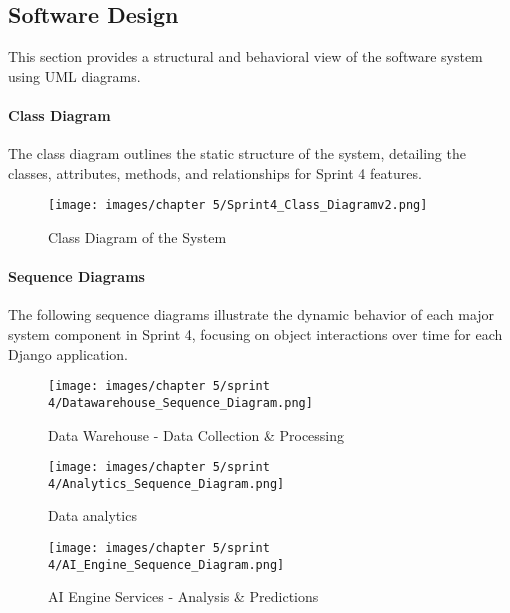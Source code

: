 \vfill
\newpage

\subsection{Software Design}

This section provides a structural and behavioral view of the software system using UML diagrams.

\paragraph{Class Diagram}

The class diagram outlines the static structure of the system, detailing the classes, attributes, methods, and relationships for Sprint 4 features.

\begin{figure}[H]
    \centering
    \texttt{[image: images/chapter 5/Sprint4\_Class\_Diagramv2.png]}
    \caption{Class Diagram of the System}
    \label{fig:class-diagram-sprint4}
\end{figure}

\paragraph{Sequence Diagrams}

The following sequence diagrams illustrate the dynamic behavior of each major system component in Sprint 4, focusing on object interactions over time for each Django application.

\begin{figure}[H]
    \centering
    \texttt{[image: images/chapter 5/sprint 4/Datawarehouse\_Sequence\_Diagram.png]}
    \caption{Data Warehouse - Data Collection \& Processing}
    \label{fig:Datawarehouse-sequence-diagram}
\end{figure}

\begin{figure}[H]
    \centering
    \texttt{[image: images/chapter 5/sprint 4/Analytics\_Sequence\_Diagram.png]}
    \caption{Data analytics}
    \label{fig:analytics-sequence-diagram}
\end{figure}

\begin{figure}[H]
    \centering
    \texttt{[image: images/chapter 5/sprint 4/AI\_Engine\_Sequence\_Diagram.png]}
    \caption{AI Engine Services - Analysis \& Predictions}
    \label{fig:ai-engine-sequence-diagram}
\end{figure}


